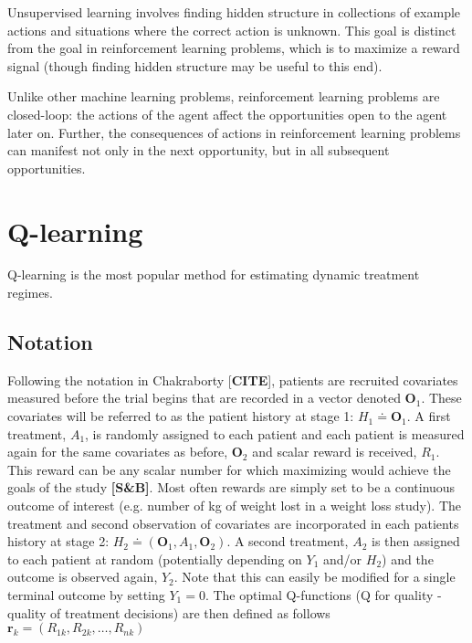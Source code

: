 \documentclass[12pt]{article}
\begin{document}
Unsupervised learning involves finding hidden structure in collections of example actions and situations where the correct action is unknown. This goal is distinct from the goal in reinforcement learning problems, which is to maximize a reward signal (though finding hidden structure may be useful to this end).

Unlike other machine learning problems, reinforcement learning problems are closed-loop: the actions of the agent affect the opportunities open to the agent later on. Further, the consequences of actions in reinforcement learning problems can manifest not only in the next opportunity, but in all subsequent opportunities.









\section{Q-learning} %
\label{sec:q_learning}

Q-learning is the most popular method for estimating dynamic treatment regimes.


\subsection{Notation} %
\label{sub:notation}
Following the notation in Chakraborty [\textbf{CITE}], patients are recruited covariates measured before the trial begins that are recorded in a vector denoted $\bm{\bm{O}}_{1}$. These covariates will be referred to as the patient history at stage 1: $H_{1} \doteq \bm{O}_{1}$. A first treatment, $A_{1}$, is randomly assigned to each patient and each patient is measured again for the same covariates as before, $\bm{O}_{2}$ and scalar reward is received, $R_{1}$. This reward can be any scalar number for which maximizing would achieve the goals of the study \textbf{[S\&B]}. Most often rewards are simply set to be a continuous outcome of interest (e.g. number of kg of weight lost in a weight loss study). The treatment and second observation of covariates are incorporated in each patients history at stage 2: $H_{2} \doteq (\bm{O}_{1}, A_{1}, \bm{O}_{2})$. A second treatment, $A_{2}$ is then assigned to each patient at random (potentially depending on $Y_{1}$ and/or $H_{2}$) and the outcome is observed again, $Y_{2}$. Note that this can easily be modified for a single terminal outcome by setting $Y_{1} = 0$. The optimal Q-functions (Q for quality - quality of treatment decisions) are then defined as follows $\bm{r}_{k} = (R_{1k}, R_{2k}, \ldots, R_{nk})$
\end{document}
